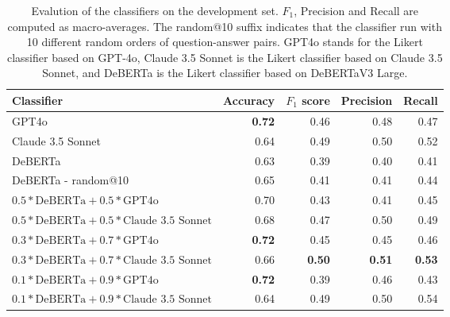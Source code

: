\begin{table*}
    \centering
    \begin{tabular}{lrrrr}
        \toprule
        Classifier & Accuracy & $F_1$ score & Precision & Recall \\
        \midrule
        GPT4o & \textbf{0.72} & 0.46 & 0.48 & 0.47 \\
        Claude 3.5 Sonnet & 0.64 & 0.49 & 0.50 & 0.52 \\
        DeBERTa & 0.63 & 0.39 & 0.40 & 0.41 \\
        DeBERTa - random@10 & 0.65 & 0.41 & 0.41 & 0.44 \\
        $0.5*\mbox{DeBERTa}+0.5*\mbox{GPT4o}$ & 0.70 & 0.43 & 0.41 & 0.45 \\
        $0.5*\mbox{DeBERTa}+0.5*\mbox{Claude 3.5 Sonnet}$ & 0.68 & 0.47 & 0.50 & 0.49 \\
        $0.3*\mbox{DeBERTa}+0.7*\mbox{GPT4o}$ & \textbf{0.72} & 0.45 & 0.45 & 0.46 \\
        $0.3*\mbox{DeBERTa}+0.7*\mbox{Claude 3.5 Sonnet}$ & 0.66 & \textbf{0.50} & \textbf{0.51} & \textbf{0.53} \\
        $0.1*\mbox{DeBERTa}+0.9*\mbox{GPT4o}$ & \textbf{0.72} & 0.39 & 0.46 & 0.43 \\
        $0.1*\mbox{DeBERTa}+0.9*\mbox{Claude 3.5 Sonnet}$ & 0.64 & 0.49 & 0.50 & 0.54 \\

        \bottomrule
    \end{tabular} 

    \caption{Evalution of the classifiers on the development set. $F_1$, Precision and Recall are computed as macro-averages. The random@10 suffix indicates that the classifier run with 10 different random orders of question-answer pairs. GPT4o stands for the Likert classifier based on GPT-4o, Claude 3.5 Sonnet is the Likert classifier based on Claude 3.5 Sonnet, and DeBERTa is the Likert classifier based on DeBERTaV3 Large.}
\end{table*}